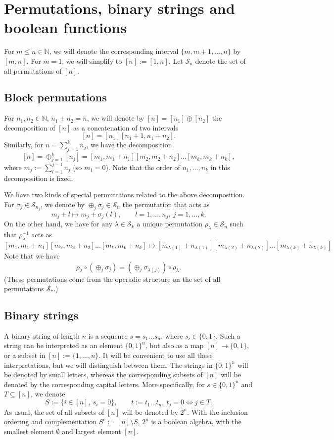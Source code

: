 \documentclass[12pt]{article}
\theoremstyle{definition}
\theoremstyle{remark}
\def\permut{\mathscr{S}}
\begin{document}
\section{Permutations, binary strings and boolean functions}


For $m\le n\in \mathbb N$, we will denote the corresponding interval $\{m,m+1,\dots,n\}$ by
$[m,n]$. For $m=1$, we will simplify to  $[n]:=[1,n]$. Let $\permut_n$ denote the set of all permutations of $[n]$.


\subsection{Block permutations}
\label{sec:permut}


 For $n_1,n_2\in \mathbb N$, $n_1+n_2=n$, 
we will denote by $[n]=[n_1]\oplus [n_2]$ the decomposition of $[n]$ as a concatenation of two 
intervals
\[
[n]=[n_1][n_1+1,n_1+n_2].
\]
Similarly, for $n=\sum_{j=1}^kn_j$, we have the decomposition
\[
[n]=\oplus_{j=1}^k[n_j]=[m_1,m_1+n_1][m_2,m_2+n_2]\dots[m_k,m_k+n_k],
\]
where $m_j:=\sum_{l=1}^{j-1} n_j$ (so $m_1=0$). Note that the order of $n_1,\dots, n_k$ in
this decomposition is
fixed. 

We have two kinds of special permutations related to the above decomposition. For
$\sigma_j\in \permut_{n_j}$, we denote by $\oplus_j \sigma_j\in \permut_n$ the permutation that acts as
\[
m_j+l\mapsto m_j+\sigma_j(l),\qquad l=1,\dots,n_j,\ j=1,\dots, k. 
\]
On the other hand, we have for any $\lambda\in \permut_k$ a unique permutation
$\rho_\lambda\in\permut_n$  such that $\rho_\lambda^{-1}$ acts as
\[
[m_1,m_1+n_1][m_2,m_2+n_2]...[m_k,m_k+n_k]\mapsto
[m_{\lambda(1)}+n_{\lambda(1)}][m_{\lambda(2)}+n_{\lambda(2)}]\dots[m_{\lambda(k)}+n_{\lambda(k)}]
\]
Note that we have
\[
\rho_\lambda\circ(\oplus_j\sigma_j)=(\oplus_j \sigma_{\lambda(j)})\circ\rho_\lambda.
\]
(These permutations  come from the operadic structure on the set of
all permutations $\permut_*$.)


\subsection{Binary strings}

A binary string of length $n$ is a sequence  $s=s_1\dots s_n$, where $s_i\in
\{0,1\}$. Such a string can be interpreted as an element $\{0,1\}^n$, but also as a 
map $[n]\to \{0,1\}$, or a subset in  $[n]:=\{1,\dots,n\}$. It will be convenient to use
all these interpretations, but we will distinguish between them. The strings in
$\{0,1\}^n$ will be denoted by small letters, whereas the corresponding subsets of $[n]$
will be denoted by the corresponding capital letters. More specifically, for $s\in \{0,1\}^n$ and 
$T\subseteq [n]$, we denote
\begin{equation}\label{eq:string_subset}
S:=\{i\in [n],\ s_i=0\},\qquad t:=t_1\dots t_n,\ t_j=0 \iff j\in T.
\end{equation}
As usual, the set of all subsets of $[n]$ will be denoted by $2^n$. 
With the inclusion ordering and complementation $S^c:=[n]\setminus S$,
$2^n$ is a boolean algebra, with the smallest element $\emptyset$ and largest element
$[n]$.  
\end{document}
